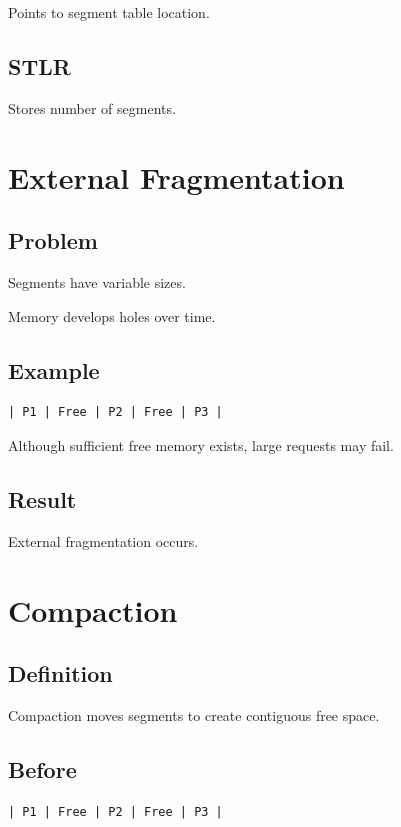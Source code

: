 Points to segment table location.

\subsection{STLR}

Stores number of segments.

\section{External Fragmentation}

\subsection{Problem}

Segments have variable sizes.

Memory develops holes over time.

\subsection{Example}

\begin{verbatim}
| P1 | Free | P2 | Free | P3 |
\end{verbatim}

Although sufficient free memory exists, large requests may fail.

\subsection{Result}

External fragmentation occurs.

\section{Compaction}

\subsection{Definition}

Compaction moves segments to create contiguous free space.

\subsection{Before}

\begin{verbatim}
| P1 | Free | P2 | Free | P3 |
\end{verbatim}

